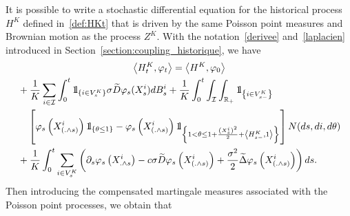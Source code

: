 \documentclass[10pt]{amsart}
\theoremstyle{definition}\newtheorem{defi}[theo]{Definition}\newtheorem{rema}[theo]{Remark}\newtheorem{exam}[theo]{Example}\newtheorem{exem}[theo]{Example}\newtheorem{nota}[theo]{Notation}
\newcommand{\Io}{\mathcal{I}}
\newcommand*\R{\mathbb{R}}
\newcommand*\ind{{\mathchoice {\rm 1\mskip-4mu l} {\rm 1\mskip-4mu l} {\rm 1\mskip-4.5mu l} {\rm 1\mskip-5mu l}}}
\begin{document}
\noindent It is possible to write a stochastic differential equation for the historical process $H^K$ defined in~\eqref{def:HKt} that is driven by the same Poisson point measures and Brownian motion as the process $Z^K$. With the notation~\eqref{derivee} and~\eqref{laplacien} introduced in Section~\ref{section:coupling_historique}, we have
\begingroup
\allowdisplaybreaks
\begin{multline}\label{eq:sde}
\left\langle H^{K}_t,\varphi_t\right\rangle = \left\langle H^{K}, \varphi_0\right\rangle\\
\begin{aligned} 
&+ \frac{1}{K}\sum_{i \in \Io}\int_0^t \ind_{\{i\in V^K_s\}} \sigma {\widetilde{D}}\varphi_s(X^i_s) dB^i_s
+\frac{1}{K}\int_0^t \int_{\Io}\int_{\R_+}\ind_{\left\{i \in V^K_{s-}\right\}}\\
&\quad \left[\varphi_{s}\left(X^i_{\left(.\wedge s\right)}\right)\ind_{\left\{\theta \leq 1\right\}} -\varphi_{s}\left(X^i_{\left(.\wedge s\right)}\right) \ind_{\left\{1 < \theta \leq 1 + \frac{\left(X^i_{s}\right)^2}{2}+\left\langle H_{s-}^{K},1\right\rangle\right\}} \right] N(ds, di, d\theta) \\
& +\frac{1}{K} \int_0^t \sum_{i \in V^K_s}\left(\partial_s \varphi_s\left(X^i_{.\wedge s}\right) -c\sigma {\widetilde{D}} \varphi_s\left(X^i_{\left(.\wedge s\right)}\right)+\frac{\sigma^2}{2} {\widetilde{\Delta}}\varphi_s\left(X^i_{\left(.\wedge s\right)}\right) \right) ds.
\end{aligned}
\end{multline}
\endgroup
Then introducing the compensated martingale measures associated with the Poisson point processes, we obtain that
\vspace*{60pt}
\pagebreak
\end{document}
